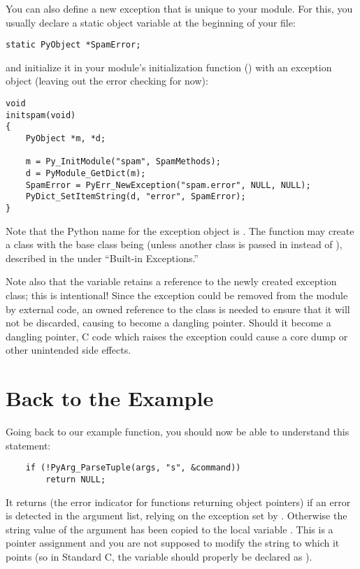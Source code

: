 You can also define a new exception that is unique to your module.
For this, you usually declare a static object variable at the
beginning of your file:

\begin{verbatim}
static PyObject *SpamError;
\end{verbatim}

and initialize it in your module's initialization function
() with an exception object (leaving out
the error checking for now):

\begin{verbatim}
void
initspam(void)
{
    PyObject *m, *d;

    m = Py_InitModule("spam", SpamMethods);
    d = PyModule_GetDict(m);
    SpamError = PyErr_NewException("spam.error", NULL, NULL);
    PyDict_SetItemString(d, "error", SpamError);
}
\end{verbatim}

Note that the Python name for the exception object is
.  The  function
may create a class with the base class being 
(unless another class is passed in instead of \NULL), described in the
 under ``Built-in
Exceptions.''

Note also that the  variable retains a reference to
the newly created exception class; this is intentional!  Since the
exception could be removed from the module by external code, an owned
reference to the class is needed to ensure that it will not be
discarded, causing  to become a dangling pointer.
Should it become a dangling pointer, C code which raises the exception
could cause a core dump or other unintended side effects.


\section{Back to the Example
         \label{backToExample}}

Going back to our example function, you should now be able to
understand this statement:

\begin{verbatim}
    if (!PyArg_ParseTuple(args, "s", &command))
        return NULL;
\end{verbatim}

It returns \NULL{} (the error indicator for functions returning
object pointers) if an error is detected in the argument list, relying
on the exception set by .  Otherwise the
string value of the argument has been copied to the local variable
.  This is a pointer assignment and you are not supposed
to modify the string to which it points (so in Standard C, the variable
 should properly be declared as ).


